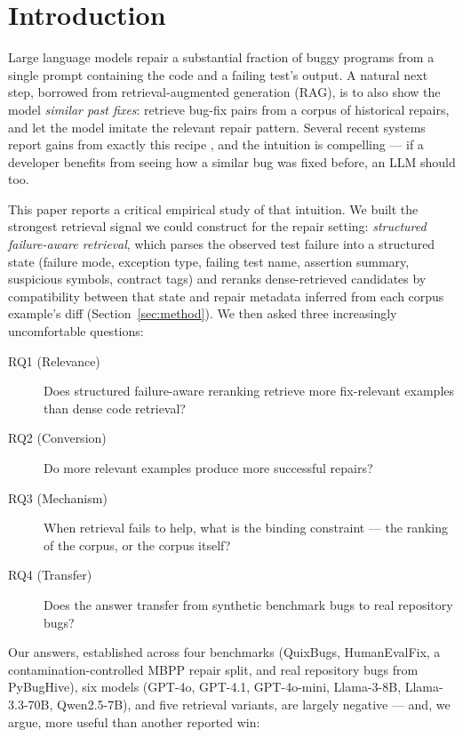 \section{Introduction}
\label{sec:intro}

Large language models repair a substantial fraction of buggy programs from a
single prompt containing the code and a failing test's output. A natural next
step, borrowed from retrieval-augmented generation (RAG), is to also show the
model \emph{similar past fixes}: retrieve bug-fix pairs from a corpus of
historical repairs, and let the model imitate the relevant repair pattern.
Several recent systems report gains from exactly this recipe
\cite{recode,inferfix,rapgen,ragfix}, and the intuition is compelling ---
if a developer benefits from seeing how a similar bug was fixed before, an LLM
should too.

This paper reports a critical empirical study of that intuition. We built the
strongest retrieval signal we could construct for the repair setting:
\emph{structured failure-aware retrieval}, which parses the observed test
failure into a structured state (failure mode, exception type, failing test
name, assertion summary, suspicious symbols, contract tags) and reranks
dense-retrieved candidates by compatibility between that state and repair
metadata inferred from each corpus example's diff
(Section~\ref{sec:method}). We then asked three increasingly uncomfortable
questions:

\begin{description}
  \item[RQ1 (Relevance)] Does structured failure-aware reranking retrieve
    more fix-relevant examples than dense code retrieval?
  \item[RQ2 (Conversion)] Do more relevant examples produce more successful
    repairs?
  \item[RQ3 (Mechanism)] When retrieval fails to help, what is the binding
    constraint --- the ranking of the corpus, or the corpus itself?
  \item[RQ4 (Transfer)] Does the answer transfer from synthetic benchmark
    bugs to real repository bugs?
\end{description}

\noindent
Our answers, established across four benchmarks (QuixBugs, HumanEvalFix, a
contamination-controlled MBPP repair split, and real repository bugs from
PyBugHive), six models (GPT-4o, GPT-4.1, GPT-4o-mini, Llama-3-8B,
Llama-3.3-70B, Qwen2.5-7B), and five retrieval variants, are largely
negative --- and, we argue, more useful than another reported win:

